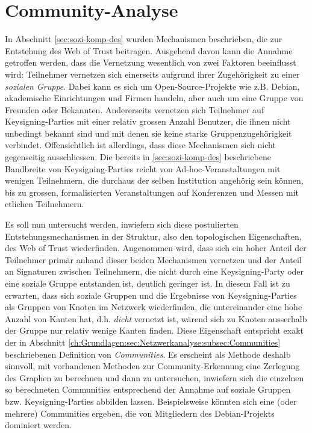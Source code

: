 \section{Community-Analyse}
\label{sec:community-analyse}

In Abschnitt \ref{sec:sozi-komp-des} wurden Mechanismen beschrieben,
die zur Entstehung des Web of Trust beitragen. Ausgehend davon kann
die Annahme getroffen werden, dass die Vernetzung wesentlich von zwei
Faktoren beeinflusst wird: Teilnehmer vernetzen sich einerseits
aufgrund ihrer Zugeh\"origkeit zu einer \emph{sozialen Gruppe}. Dabei
kann es sich um Open-Source-Projekte wie z.B. Debian, akademische
Einrichtungen und Firmen handeln, aber auch um eine Gruppe von
Freunden oder Bekannten. Andererseits vernetzen sich Teilnehmer auf
Keysigning-Parties mit einer relativ grossen Anzahl Benutzer, die
ihnen nicht unbedingt bekannt sind und mit denen sie keine starke
Gruppenzugeh\"origkeit verbindet. Offensichtlich ist allerdings, dass
diese Mechanismen sich nicht gegenseitig ausschliessen. Die bereits in
\ref{sec:sozi-komp-des} beschriebene Bandbreite von Keysigning-Parties
reicht von Ad-hoc-Veranstaltungen mit wenigen Teilnehmern, die
durchaus der selben Institution angeh\"orig sein k\"onnen, bis zu
grossen, formalisierten Veranstaltungen auf Konferenzen und Messen mit
etlichen Teilnehmern.

Es soll nun untersucht werden, inwiefern sich diese postulierten
Entstehungsmechanismen in der Struktur, also den topologischen
Eigenschaften, des Web of Trust wiederfinden. Angenommen wird, dass
sich ein hoher Anteil der Teilnehmer prim\"ar anhand dieser beiden
Mechanismen vernetzen und der Anteil an Signaturen zwischen
Teilnehmern, die nicht durch eine Keysigning-Party oder eine soziale
Gruppe entstanden ist, deutlich geringer ist. In diesem Fall ist zu
erwarten, dass sich soziale Gruppen und die Ergebnisse von
Keysigning-Parties als Gruppen von Knoten im Netzwerk wiederfinden,
die untereinander eine hohe Anzahl von Kanten hat, d.h. \emph{dicht}
vernetzt ist, w\"arend sich zu Knoten ausserhalb der Gruppe nur
relativ wenige Kanten finden. Diese Eigenschaft entspricht exakt der
in Abschnitt
\ref{ch:Grundlagen:sec:Netzwerkanalyse:subsec:Communities}
beschriebenen Definition von \emph{Communities}. Es erscheint als
Methode deshalb sinnvoll, mit vorhandenen Methoden zur
Community-Erkennung eine Zerlegung des Graphen zu berechnen und dann
zu untersuchen, inwiefern sich die einzelnen so berechneten
Communities entsprechend der Annahme auf soziale Gruppen
bzw. Keysigning-Parties abbilden lassen. Beispielsweise k\"onnten sich
eine (oder mehrere) Communities ergeben, die von Mitgliedern des
Debian-Projekts dominiert werden.

